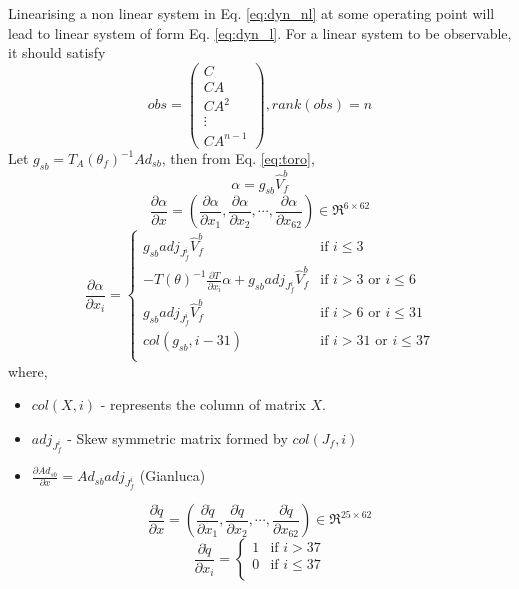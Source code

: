 \documentclass[12pt]{article}
\def\dfdx#1#2{\frac{\partial {#1}}{\partial {#2}}}
\begin{document}
Linearising a non linear system in Eq. \ref{eq:dyn_nl} at some operating point will lead to linear system of form Eq. \ref{eq:dyn_l}. For a linear system to be observable, it should satisfy
\begin{equation}
obs =
\begin{pmatrix}
C\\ CA \\ CA^{2}\\ \vdots \\ CA^{n-1}
\end{pmatrix}
, rank(obs) =n
\end{equation}
Let $g_{sb} = T_{A}(\theta_{f})^{-1}Ad_{sb}$, then from Eq. \ref{eq:toro},
$$\alpha = g_{sb} \hat{V}_{f}^{b}$$
\begin{equation}
\label{eq:dtoro_alpha}
\dfdx{\alpha}{x} = \left(\dfdx{\alpha}{x_{1}}, \dfdx{\alpha}{x_{2}}, \cdots , \dfdx{\alpha}{x_{62}}\right) \in \Re^{6 \times 62}
\end{equation}
\[
 \dfdx{\alpha}{x_{i}} = 
  \begin{cases}
   g_{sb}adj_{J_{f}^{i}} \hat{V}_{f}^{b} & \text{if } i \leq 3 \\
  -T(\theta)^{-1}\dfdx{T}{x_{i}}\alpha + g_{sb} adj_{J_{f}^{i}} \hat{V}_{f}^{b} & \text{if } i > 3 \text{ or } i \leq 6 \\
   g_{sb} adj_{J_{f}^{i}} \hat{V}_{f}^{b} & \text{if } i > 6 \text{ or } i \leq 31 \\
   col(g_{sb},i-31) & \text{if } i > 31 \text{ or } i \leq 37 \\
  \end{cases}
\]
where,
\begin{itemize}
\item $col(X,i)$ - represents the column of matrix $X$.
\item $adj_{J_{f}^{i}}$ - Skew symmetric matrix formed by $col(J_{f},i)$
\item $\dfdx{Ad_{sb}}{x} = Ad_{sb} adj_{J_{f}^{i}} $ (Gianluca)
\end{itemize}
\begin{equation}
\label{eq:dtoro_dq}
\dfdx{\dot{q}}{x} = \left(\dfdx{\dot{q}}{x_{1}}, \dfdx{\dot{q}}{x_{2}}, \cdots , \dfdx{\dot{q}}{x_{62}}\right) \in \Re^{25 \times 62}
\end{equation}
\[
\dfdx{\dot{q}}{x_{i}} = 
	\begin{cases}
	1 & \text{if } i > 37 \\
	0 & \text{if } i \le 37  \\
	\end{cases}
\]
\end{document}
